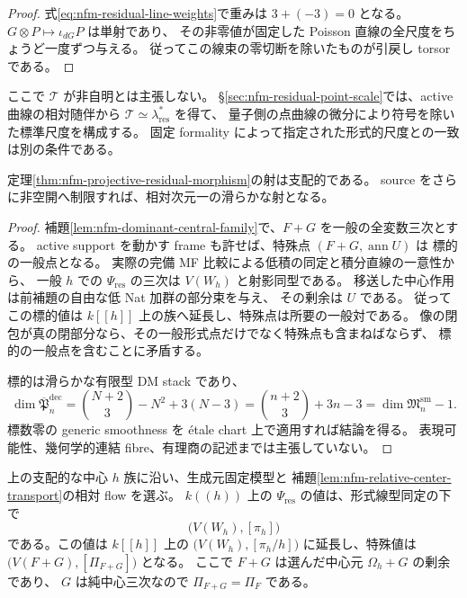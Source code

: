 \begin{proof}
式\eqref{eq:nfm-residual-line-weights}で重みは $3+(-3)=0$ となる。
$G\otimes P\mapsto\iota_{dG}P$ は単射であり、
その非零値が固定した Poisson 直線の全尺度をちょうど一度ずつ与える。
従ってこの線束の零切断を除いたものが引戻し torsor である。
\end{proof}

ここで $\mathscr T$ が非自明とは主張しない。
\S\ref{sec:nfm-residual-point-scale}では、active 曲線の相対随伴から
$\mathscr T\simeq\lambda_{\mathrm{res}}^*$ を得て、
量子側の点曲線の微分により符号を除いた標準尺度を構成する。
固定 formality によって指定された形式的尺度との一致は別の条件である。

\begin{proposition}[支配性と一般相対次元]
\label{prop:nfm-projective-residual-dominance}
定理\ref{thm:nfm-projective-residual-morphism}の射は支配的である。
source をさらに非空開へ制限すれば、相対次元一の滑らかな射となる。
\end{proposition}

\begin{proof}
補題\ref{lem:nfm-dominant-central-family}で、$F+G$ を一般の全変数三次とする。
active support を動かす frame も許せば、特殊点 $(F+G,\operatorname{ann}U)$ は
標的の一般点となる。
実際の完備 MF 比較による低積の同定と積分直線の一意性から、
一般 $h$ での $\Psi_{\mathrm{res}}$ の三次は $V(W_h)$ と射影同型である。
移送した中心作用は前補題の自由な低 Nat 加群の部分束を与え、
その剰余は $U$ である。
従ってこの標的値は $k[[h]]$ 上の族へ延長し、特殊点は所要の一般対である。
像の閉包が真の閉部分なら、その一般形式点だけでなく特殊点も含まねばならず、
標的の一般点を含むことに矛盾する。

標的は滑らかな有限型 DM stack であり、
\[
 \dim\overline{\mathfrak P}_n^{\mathrm{dec}}
 =\binom{N+2}{3}-N^2+3(N-3)
 =\binom{n+2}{3}+3n-3
 =\dim\mathfrak M_n^{\mathrm{sm}}-1.
\]
標数零の generic smoothness を étale chart 上で適用すれば結論を得る。
表現可能性、幾何学的連結 fibre、有理商の記述までは主張していない。
\end{proof}


\begin{corollary}
\label{cor:nfm-projective-formal-compatibility}
上の支配的な中心 $h$ 族に沿い、生成元固定模型と
補題\ref{lem:nfm-relative-center-transport}の相対 flow を選ぶ。
$k((h))$ 上の $\Psi_{\mathrm{res}}$ の値は、形式線型同定の下で
\[
 \bigl(V(W_h),[\pi_h]\bigr)
\]
である。この値は $k[[h]]$ 上の
$\bigl(V(W_h),[\pi_h/h]\bigr)$ に延長し、特殊値は
$\bigl(V(F+G),[\Pi_{F+G}]\bigr)$ となる。
ここで $F+G$ は選んだ中心元 $\Omega_h+G$ の剰余であり、
$G$ は純中心三次なので $\Pi_{F+G}=\Pi_F$ である。
\end{corollary}

